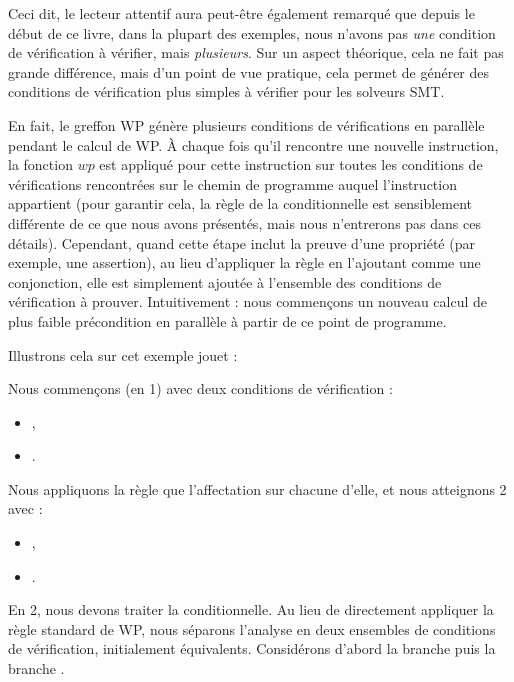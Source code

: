 Ceci dit, le lecteur attentif aura peut-être également remarqué que depuis le
début de ce livre, dans la plupart des exemples, nous n'avons pas \textit{une}
condition de vérification à vérifier, mais \textit{plusieurs}. Sur un aspect
théorique, cela ne fait pas grande différence, mais d'un point de vue pratique,
cela permet de générer des conditions de vérification plus simples à vérifier
pour les solveurs SMT.


En fait, le greffon WP génère plusieurs conditions de vérifications en parallèle
pendant le calcul de WP. À chaque fois qu'il rencontre une nouvelle instruction,
la fonction $wp$ est appliqué pour cette instruction sur toutes les conditions
de vérifications rencontrées sur le chemin de programme auquel l'instruction
appartient (pour garantir cela, la règle de la conditionnelle est sensiblement
différente de ce que nous avons présentés, mais nous n'entrerons pas dans ces
détails). Cependant, quand cette étape inclut la preuve d'une propriété (par
exemple, une assertion), au lieu d'appliquer la règle en l'ajoutant comme une
conjonction, elle est simplement ajoutée à l'ensemble des conditions de
vérification à prouver. Intuitivement : nous commençons un nouveau calcul de plus
faible précondition en parallèle à partir de ce point de programme.


Illustrons cela sur cet exemple jouet :




Nous commençons (en 1) avec deux conditions de vérification :
\begin{itemize}
  \item {},
  \item {}.
\end{itemize}
Nous appliquons la règle que l'affectation sur chacune d'elle, et nous atteignons
2 avec :
\begin{itemize}
  \item {},
  \item {}.
\end{itemize}
En 2, nous devons traiter la conditionnelle. Au lieu de directement appliquer
la règle standard de WP, nous séparons l'analyse en deux ensembles de conditions
de vérification, initialement équivalents. Considérons d'abord la branche
 puis la branche .


